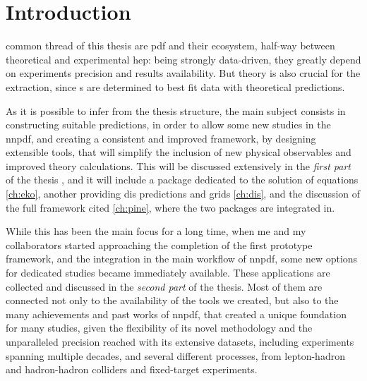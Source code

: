 
\cleardoublepage
{}

\chapter*{Introduction}
%
	{}

 common thread of this thesis are \acrfull{pdf} and their
ecosystem, half-way between theoretical and experimental \acrfull{hep}: being
strongly data-driven, they greatly depend on experiments precision and results
availability.
But theory is also crucial for the extraction, since \pdf{}s are determined to
best fit data with theoretical predictions.

As it is possible to infer from the thesis structure, the main subject consists
in constructing suitable predictions, in order to allow some new studies
in the \acrlong{nnpdf}, and creating a consistent and improved framework, by
designing extensible tools, that will simplify the inclusion of new physical
observables and improved theory calculations.
This will be discussed extensively in the \textit{first part} of the thesis
, and it will include a package dedicated to the solution of
\dglap equations \cref{ch:eko}, another providing \acrfull{dis} predictions and
grids \cref{ch:dis}, and the discussion of the full framework cited
\cref{ch:pine}, where the two packages are integrated in.

While this has been the main focus for a long time, when me and my
collaborators started approaching the completion of the first prototype
framework, and the integration in the main workflow of \acrshort{nnpdf}, some
new options for dedicated studies became immediately available. These
applications are collected and discussed in the \textit{second part} of the
thesis.
Most of them are connected not only to the availability of the tools we
created, but also to the many achievements and past works of \acrshort{nnpdf},
that created a unique foundation for many studies, given the flexibility of its
novel methodology and the unparalleled precision reached with its extensive
datasets, including experiments spanning multiple decades, and several
different processes, from lepton-hadron and hadron-hadron colliders and
fixed-target experiments.

